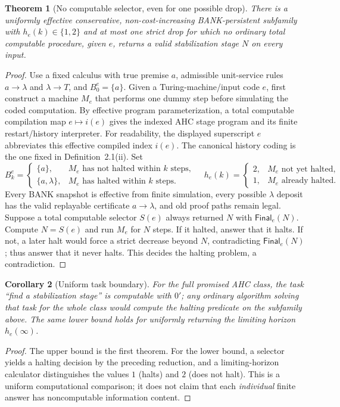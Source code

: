 \documentclass[11pt,letterpaper]{article}
\newtheorem{theorem}{Theorem}[section]
\newtheorem{corollary}[theorem]{Corollary}
\theoremstyle{definition}
\theoremstyle{remark}
\newcommand{\Fin}{\mathsf{Final}}
\begin{document}
\begin{theorem}[No computable selector, even for one possible drop]
There is a uniformly effective conservative, non-cost-increasing BANK-persistent subfamily with $h_e(k)\in\{1,2\}$ and at most one strict drop for which no ordinary total computable procedure, given $e$, returns a valid stabilization stage $N$ on every input.
\end{theorem}
\begin{proof}
Use a fixed calculus with true premise $a$, admissible unit-service rules $a\to\lambda$ and $\lambda\to T$, and $B^e_0=\{a\}$. Given a Turing-machine/input code $e$, first construct a machine $M_e$ that performs one dummy step before simulating the coded computation. By effective program parameterization, a total computable compilation map $e\mapsto i(e)$ gives the indexed AHC stage program and its finite restart/history interpreter. For readability, the displayed superscript $e$ abbreviates this effective compiled index $i(e)$. The canonical history coding is the one fixed in Definition~2.1(ii). Set
\[
B^e_k=\begin{cases}
\{a\},&M_e\text{ has not halted within }k\text{ steps},\\
\{a,\lambda\},&M_e\text{ has halted within }k\text{ steps}.
\end{cases}
\quad
h_e(k)=\begin{cases}2,&M_e\text{ not yet halted},\\1,&M_e\text{ already halted}.\end{cases}
\]
Every BANK snapshot is effective from finite simulation, every possible $\lambda$ deposit has the valid replayable certificate $a\to\lambda$, and old proof paths remain legal. Suppose a total computable selector $S(e)$ always returned $N$ with $\Fin_e(N)$. Compute $N=S(e)$ and run $M_e$ for $N$ steps. If it halted, answer that it halts. If not, a later halt would force a strict decrease beyond $N$, contradicting $\Fin_e(N)$; thus answer that it never halts. This decides the halting problem, a contradiction.
\end{proof}

\begin{corollary}[Uniform task boundary]
For the full promised AHC class, the task ``find a stabilization stage'' is computable with $0'$; any ordinary algorithm solving that task for the whole class would compute the halting predicate on the subfamily above. The same lower bound holds for uniformly returning the limiting horizon $h_e(\infty)$.
\end{corollary}
\begin{proof}
The upper bound is the first theorem. For the lower bound, a selector yields a halting decision by the preceding reduction, and a limiting-horizon calculator distinguishes the values $1$ (halts) and $2$ (does not halt). This is a uniform computational comparison; it does not claim that each \emph{individual} finite answer has noncomputable information content.
\end{proof}
\end{document}
